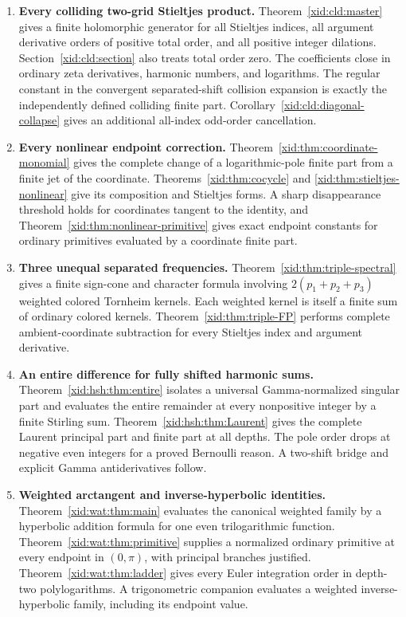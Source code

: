 \documentclass[11pt,a4paper]{article}
\numberwithin{equation}{section}
\theoremstyle{definition}
\theoremstyle{remark}
\begin{document}
\begin{enumerate}[label=\textbf{\arabic*.},leftmargin=*]
\item \textbf{Every colliding two-grid Stieltjes product.}
Theorem~\ref{xid:cld:master} gives a finite holomorphic generator for all
Stieltjes indices, all argument derivative orders of positive total order,
and all positive integer dilations. Section~\ref{xid:cld:section} also treats
total order zero. The coefficients close in ordinary zeta derivatives,
harmonic numbers, and logarithms. The regular constant in the convergent
separated-shift collision expansion is exactly the independently defined
colliding finite part. Corollary~\ref{xid:cld:diagonal-collapse} gives an
additional all-index odd-order cancellation.

\item \textbf{Every nonlinear endpoint correction.}
Theorem~\ref{xid:thm:coordinate-monomial} gives the complete change of a
logarithmic-pole finite part from a finite jet of the coordinate.
Theorems~\ref{xid:thm:cocycle} and \ref{xid:thm:stieltjes-nonlinear} give its
composition and Stieltjes forms. A sharp disappearance threshold holds
for coordinates tangent to the identity, and
Theorem~\ref{xid:thm:nonlinear-primitive} gives exact endpoint constants for
ordinary primitives evaluated by a coordinate finite part.

\item \textbf{Three unequal separated frequencies.}
Theorem~\ref{xid:thm:triple-spectral} gives a finite sign-cone and character
formula involving $2(p_1+p_2+p_3)$ weighted colored Tornheim kernels.
Each weighted kernel is itself a finite sum of ordinary colored kernels.
Theorem~\ref{xid:thm:triple-FP} performs complete ambient-coordinate
subtraction for every Stieltjes index and argument derivative.

\item \textbf{An entire difference for fully shifted harmonic sums.}
Theorem~\ref{xid:hsh:thm:entire} isolates a universal Gamma-normalized
singular part and evaluates the entire remainder at every nonpositive
integer by a finite Stirling sum. Theorem~\ref{xid:hsh:thm:Laurent} gives
the complete Laurent principal part and finite part at all depths.
The pole order drops at negative even integers for a proved Bernoulli
reason. A two-shift bridge and explicit Gamma antiderivatives follow.

\item \textbf{Weighted arctangent and inverse-hyperbolic identities.}
Theorem~\ref{xid:wat:thm:main} evaluates the canonical weighted family by a
hyperbolic addition formula for one even trilogarithmic function.
Theorem~\ref{xid:wat:thm:primitive} supplies a normalized ordinary primitive
at every endpoint in $(0,\pi)$, with principal branches justified.
Theorem~\ref{xid:wat:thm:ladder} gives every Euler integration order in
depth-two polylogarithms. A trigonometric companion evaluates a weighted
inverse-hyperbolic family, including its endpoint value.
\end{enumerate}
\end{document}
